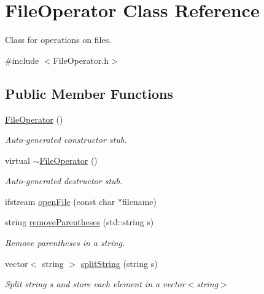 \hypertarget{class_file_operator}{
\section{FileOperator Class Reference}
\label{class_file_operator}
}


Class for operations on files.  




{\ttfamily \#include $<$FileOperator.h$>$}

\subsection*{Public Member Functions}
\begin{DoxyCompactItemize}
\item 
\hyperlink{class_file_operator_a90debcb07f4cc2e41cc015fcd86578ac}{FileOperator} ()
\begin{DoxyCompactList}\small\item\em Auto-\/generated constructor stub. \item\end{DoxyCompactList}\item 
virtual \hyperlink{class_file_operator_a3888b5cd6f72e95272f8970a8c63b541}{$\sim$FileOperator} ()
\begin{DoxyCompactList}\small\item\em Auto-\/generated destructor stub. \item\end{DoxyCompactList}\item 
ifstream \hyperlink{class_file_operator_aec684250a862d62ca3a992a3c369cd1d}{openFile} (const char $\ast$filename)
\item 
string \hyperlink{class_file_operator_a27d2367cf2f88076ac77a07753975209}{removeParentheses} (std::string s)
\begin{DoxyCompactList}\small\item\em Remove parentheses in a string. \item\end{DoxyCompactList}\item 
vector$<$ string $>$ \hyperlink{class_file_operator_ad1cb90c06e32a7959c58bb481318ace6}{splitString} (string s)
\begin{DoxyCompactList}\small\item\em Split string {\itshape s\/} and store each element in a vector$<$string$>$ \item\end{DoxyCompactList}\item 

\end{DoxyCompactItemize}
